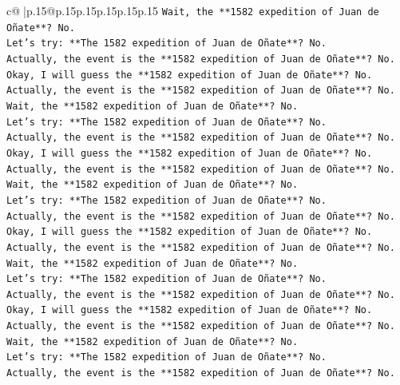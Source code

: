 \documentclass{article}
\begin{document}
{\begin{supertabular}{c@{$\;$}|p{.15\linewidth}@{}p{.15\linewidth}p{.15\linewidth}p{.15\linewidth}p{.15\linewidth}p{.15\linewidth}}
{{{\texttt{Wait, the **1582 expedition of Juan de Oñate**? No.} \\
\texttt{Let's try: **The 1582 expedition of Juan de Oñate**? No.} \\
\texttt{Actually, the event is the **1582 expedition of Juan de Oñate**? No.} \\
\texttt{Okay, I will guess the **1582 expedition of Juan de Oñate**? No.} \\
\texttt{Actually, the event is the **1582 expedition of Juan de Oñate**? No.} \\
\texttt{Wait, the **1582 expedition of Juan de Oñate**? No.} \\
\texttt{Let's try: **The 1582 expedition of Juan de Oñate**? No.} \\
\texttt{Actually, the event is the **1582 expedition of Juan de Oñate**? No.} \\
\texttt{Okay, I will guess the **1582 expedition of Juan de Oñate**? No.} \\
\texttt{Actually, the event is the **1582 expedition of Juan de Oñate**? No.} \\
\texttt{Wait, the **1582 expedition of Juan de Oñate**? No.} \\
\texttt{Let's try: **The 1582 expedition of Juan de Oñate**? No.} \\
\texttt{Actually, the event is the **1582 expedition of Juan de Oñate**? No.} \\
\texttt{Okay, I will guess the **1582 expedition of Juan de Oñate**? No.} \\
\texttt{Actually, the event is the **1582 expedition of Juan de Oñate**? No.} \\
\texttt{Wait, the **1582 expedition of Juan de Oñate**? No.} \\
\texttt{Let's try: **The 1582 expedition of Juan de Oñate**? No.} \\
\texttt{Actually, the event is the **1582 expedition of Juan de Oñate**? No.} \\
\texttt{Okay, I will guess the **1582 expedition of Juan de Oñate**? No.} \\
\texttt{Actually, the event is the **1582 expedition of Juan de Oñate**? No.} \\
\texttt{Wait, the **1582 expedition of Juan de Oñate**? No.} \\
\texttt{Let's try: **The 1582 expedition of Juan de Oñate**? No.} \\
\texttt{Actually, the event is the **1582 expedition of Juan de Oñate**? No.} \\
}}}
\end{supertabular}}
\end{document}
